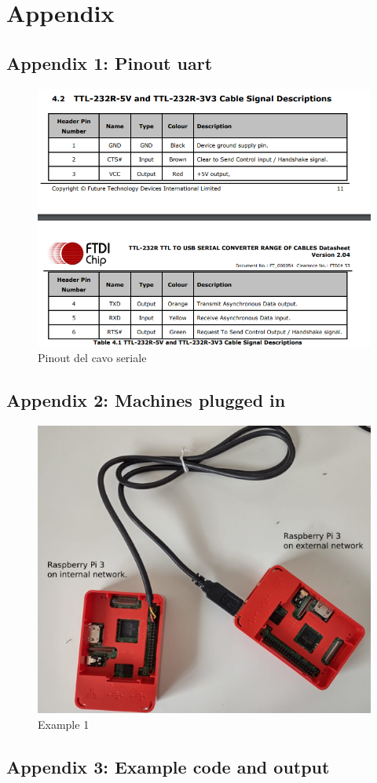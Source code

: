 \documentclass[a4paper,11pt]{scrartcl}
\begin{document}
\section{Appendix}
\subsection{Appendix 1: Pinout uart}
\begin{figure}[htbp]
\centerline{\includegraphics{pinoutuart.png}}
\caption{Pinout del cavo seriale}
\label{fig2}
\end{figure}

\subsection{Appendix 2: Machines plugged in}
\begin{figure}[htbp]
\centerline{\includegraphics{0.0.1.png}}
\caption{Example 1}
\label{fig}
\end{figure}

\subsection{Appendix 3: Example code and output}



\end{document}
